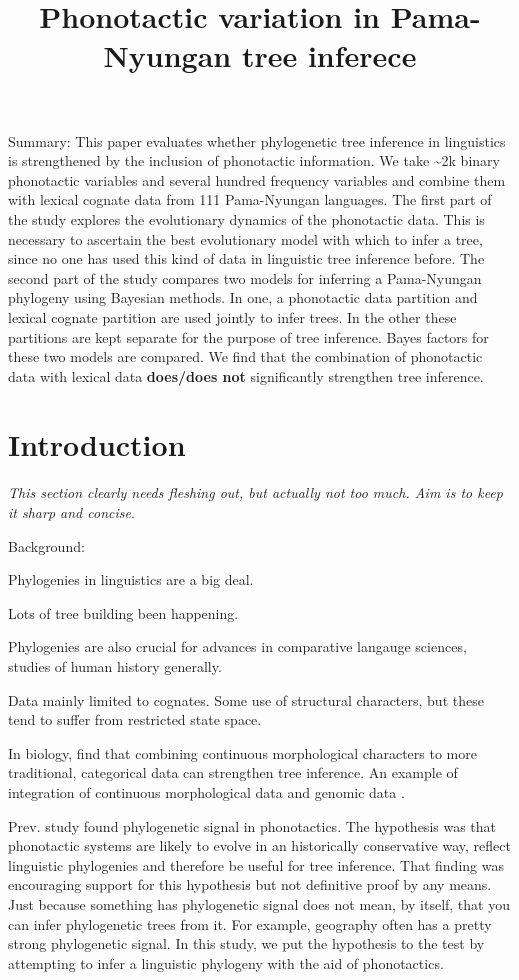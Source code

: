 \documentclass[]{article}
\title{Phonotactic variation in Pama-Nyungan tree inferece}
\author{}
\date{\vspace{-2.5em}}
\begin{document}
\maketitle

Summary: This paper evaluates whether phylogenetic tree inference in linguistics is strengthened by the inclusion of phonotactic information. We take \textasciitilde{}2k binary phonotactic variables and several hundred frequency variables and combine them with lexical cognate data from 111 Pama-Nyungan languages. The first part of the study explores the evolutionary dynamics of the phonotactic data. This is necessary to ascertain the best evolutionary model with which to infer a tree, since no one has used this kind of data in linguistic tree inference before. The second part of the study compares two models for inferring a Pama-Nyungan phylogeny using Bayesian methods. In one, a phonotactic data partition and lexical cognate partition are used jointly to infer trees. In the other these partitions are kept separate for the purpose of tree inference. Bayes factors for these two models are compared. We find that the combination of phonotactic data with lexical data \textbf{does/does not} significantly strengthen tree inference.

\hypertarget{pn-tree-intro}{%
\section{Introduction}\label{pn-tree-intro}}

\emph{This section clearly needs fleshing out, but actually not too much. Aim is to keep it sharp and concise}.

Background:

Phylogenies in linguistics are a big deal.

Lots of tree building been happening.

Phylogenies are also crucial for advances in comparative langauge sciences, studies of human history generally.

Data mainly limited to cognates. Some use of structural characters, but these tend to suffer from restricted state space.

In biology, \textcite{parins-fukuchi_use_2018} find that combining continuous morphological characters to more traditional, categorical data can strengthen tree inference. An example of integration of continuous morphological data and genomic data \textcite{domel_combining_2019}.

Prev. study \autocite{macklin-cordes_phylogenetic_2020} found phylogenetic signal in phonotactics. The hypothesis was that phonotactic systems are likely to evolve in an historically conservative way, reflect linguistic phylogenies and therefore be useful for tree inference. That finding was encouraging support for this hypothesis but not definitive proof by any means. Just because something has phylogenetic signal does not mean, by itself, that you can infer phylogenetic trees from it. For example, geography often has a pretty strong phylogenetic signal. In this study, we put the hypothesis to the test by attempting to infer a linguistic phylogeny with the aid of phonotactics.
\end{document}
